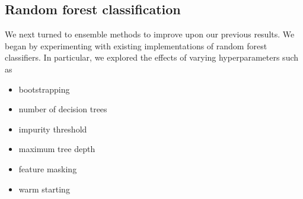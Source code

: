 \documentclass{article}
\begin{document}
\begin{multicols}{2}
\section{Random forest classification}

We next turned to ensemble methods
to improve upon our previous results.
We began by experimenting with
existing implementations of random forest classifiers.
In particular,
we explored the effects of varying hyperparameters such as
\begin{itemize}
    \item
    bootstrapping
    \item
    number of decision trees
    \item
    impurity threshold
    \item
    maximum tree depth
    \item
    feature masking
    \item
    warm starting
\end{itemize}


\end{multicols}
\end{document}
